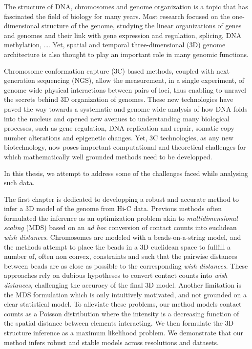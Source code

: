 


\begin{abstracts}        %

The structure of DNA, chromosomes and genome organization is a topic that has
fascinated the field of biology for many years. Most research focused on the
one-dimensional structure of the genome, studying the linear organizations of
genes and genomes and their link with gene expression and regulation,
splicing, DNA methylation, \dots. Yet, spatial and temporal three-dimensional
(3D) genome architecture is also thought to play an important role in many
genomic functions.

Chromosome conformation capture (3C) based methods, coupled with next
generation sequencing (NGS), allow the measurement, in a single experiment, of
genome wide physical interactions between pairs of loci, thus enabling to
unravel the secrets behind 3D organization of genomes. These new technologies
have paved the way towards a systematic and genome wide analysis of how DNA
folds into the nucleus and opened new avenues to understanding many biological
processes, such as gene regulation, DNA replication and repair, somatic copy
number alterations and epigenetic changes. Yet, 3C technologies, as any new
biotechnology, now poses important computational and theoretical challenges
for which mathematically well grounded methods need to be developped.

In this thesis, we attempt to address some of the challenges faced while
analysing such data.

The first chapter is dedicated to developping a robust and accurate method to
infer a 3D model of the genome from Hi-C data. Previous methods often
formulated the inference as an optimization problem akin to {\em
multidimensional scaling } (MDS) based on an {\em ad hoc} conversion of
contact counts into euclidean {\em wish distances}. Chromosomes are modeled
with a beads-on-a-string model, and the methods attempt to place the beads in
a 3D euclidean space to fullfill a number of, often non convex, constraints
and such that the pairwise distances between beads are as close as possible
to the corresponding {\em wish distances}. These approaches rely on dubious
hypotheses to convert contact counts into {\em wish distances}, challenging
the accuracy of the final 3D model. Another limitation is the MDS formulation
which is only intuitively motivated, and not grounded on a clear statistical
model. To alleviate these problems, our method models contact counts as a
Poisson distribution where the
intensity is a decreasing function of the spatial distance between elements
interacting. We then formulate the 3D structure inference as a maximum
likelihood problem. We demonstrate that our method infers robust and stable
models across resolutions and datasets.


\end{abstracts}
